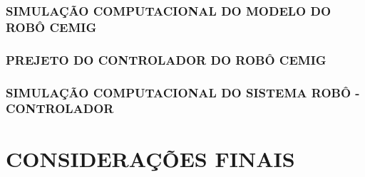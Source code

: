 \documentclass[12pt,oneside,a4paper, chapter=TITLE, section = TITLE, english, brazil]{abntex2}
\begin{document}

\subsection{SIMULAÇÃO COMPUTACIONAL DO MODELO DO ROBÔ CEMIG}


\subsection{PREJETO DO CONTROLADOR DO ROBÔ CEMIG}


\subsection{SIMULAÇÃO COMPUTACIONAL DO SISTEMA ROBÔ - CONTROLADOR}



\chapter{CONSIDERAÇÕES FINAIS}


\end{document}
